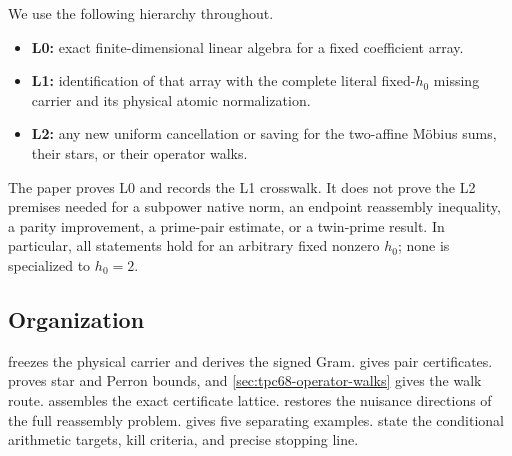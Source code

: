 We use the following hierarchy throughout.
\begin{itemize}
 \item \textbf{L0:} exact finite-dimensional linear algebra for a fixed
       coefficient array.
 \item \textbf{L1:} identification of that array with the complete literal
       fixed-\(h_0\) missing carrier and its physical atomic normalization.
 \item \textbf{L2:} any new uniform cancellation or saving for the
       two-affine M\"obius sums, their stars, or their operator walks.
\end{itemize}
The paper proves L0 and records the L1 crosswalk.  It does not prove the L2
premises needed for a subpower native norm, an endpoint reassembly
inequality, a parity improvement, a prime-pair estimate, or a twin-prime
result.  In particular, all statements hold for an arbitrary fixed
nonzero \(h_0\); none is specialized to \(h_0=2\).

\subsection{Organization}

 freezes the physical carrier and derives
the signed Gram.   gives pair certificates.
 proves star and Perron bounds, and
\cref{sec:tpc68-operator-walks} gives the walk route.
 assembles the exact certificate
lattice.   restores the nuisance
directions of the full reassembly problem.
 gives five separating examples.
 state the
conditional arithmetic targets, kill criteria, and precise stopping line.
